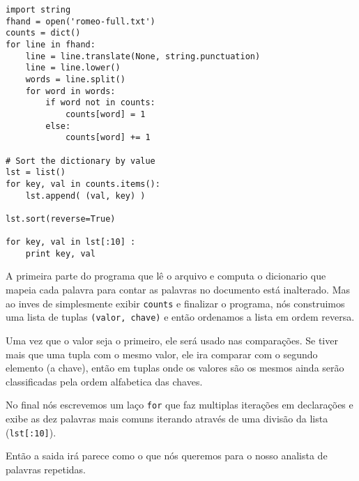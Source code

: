\beforeverb
\begin{verbatim}
import string
fhand = open('romeo-full.txt')
counts = dict()
for line in fhand:
    line = line.translate(None, string.punctuation)
    line = line.lower()
    words = line.split()
    for word in words:
        if word not in counts:
            counts[word] = 1
        else:
            counts[word] += 1

# Sort the dictionary by value
lst = list()
for key, val in counts.items():
    lst.append( (val, key) )

lst.sort(reverse=True)

for key, val in lst[:10] :
    print key, val
\end{verbatim}
\afterverb
%
A primeira parte do programa que lê o arquivo e computa o dicionario
que mapeia cada palavra para contar as palavras no documento está
inalterado. Mas ao inves de simplesmente exibir {\tt counts} e 
finalizar o programa, nós construimos uma lista de tuplas 
{\tt (valor, chave)} e então ordenamos a lista em ordem reversa.

Uma vez que o valor seja o primeiro, ele será usado nas comparações.
Se tiver mais que uma tupla com o mesmo valor, ele ira comparar
com o segundo elemento (a chave), então em tuplas onde os valores são
os mesmos ainda serão classificadas pela ordem alfabetica das chaves.

No final nós escrevemos um laço {\tt for} que faz multiplas
iterações em declarações e exibe as dez palavras mais comuns iterando
através de uma divisão da lista ({\tt lst[:10]}).

Então a saida irá parece como o que nós queremos para o nosso
analista de palavras repetidas.

